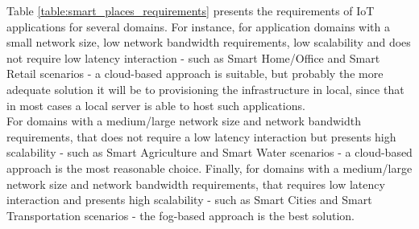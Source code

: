 Table \ref{table:smart_places_requirements} presents the requirements of \gls{IoT} applications
for several domains. For instance, for application domains with a small network size, low network
bandwidth requirements, low scalability and does not require low latency interaction - such as Smart
Home/Office and Smart Retail scenarios - a cloud-based approach is suitable, but probably the more adequate
solution it will be to provisioning the infrastructure in local, since that in most cases a local
server is able to host such applications.\\

For domains with a medium/large network size and network bandwidth requirements, that does not require
a low latency interaction but presents high scalability - such as Smart Agriculture and Smart Water
scenarios - a cloud-based approach is the most reasonable choice. Finally, for domains with a
medium/large network size and network bandwidth requirements, that requires low latency interaction
and presents high scalability - such as Smart Cities and Smart Transportation scenarios - the
fog-based approach is the best solution.

